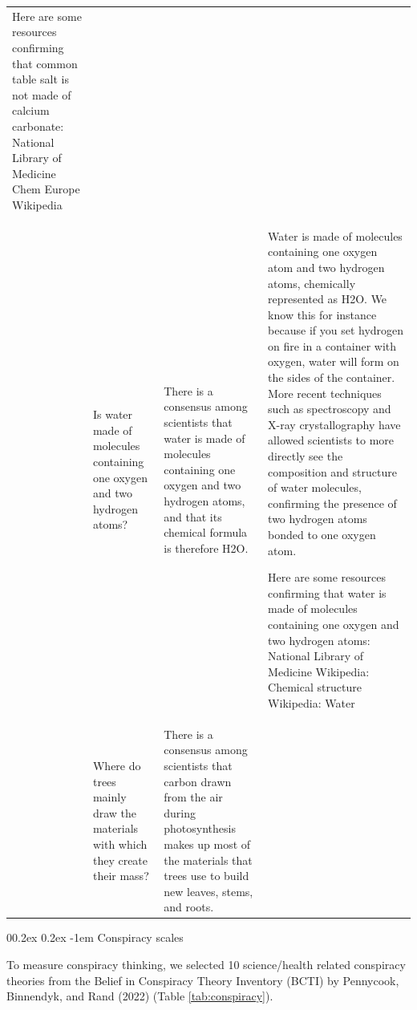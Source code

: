 \documentclass[
  doc,floatsintext]{apa6}
\makeatletter
\let\oldparagraph\paragraph
\renewcommand{\paragraph}[1]{\oldparagraph{#1}\mbox{}}
\renewcommand{\paragraph}{\@startsection{paragraph}{4}{\parindent}%
  {0\baselineskip \@plus 0.2ex \@minus 0.2ex}%
  {-1em}%
  {\normalfont\normalsize\bfseries\itshape\typesectitle}}
\makeatother
\begin{document}
\begin{longtable}[t]{>{\raggedleft\arraybackslash}p{1em}>{\raggedright\arraybackslash}p{10em}>{\raggedright\arraybackslash}p{10em}>{\raggedright\arraybackslash}p{23em}}
Here are some resources confirming that common table salt is not made of calcium carbonate: 
National Library of Medicine 
Chem Europe 
Wikipedia\\
10 & Is water made of molecules containing one oxygen and two hydrogen atoms? & There is a consensus among scientists that water is made of molecules containing one oxygen and two hydrogen atoms, and that its chemical formula is therefore H2O. & Water is made of molecules containing one oxygen atom and two hydrogen atoms, chemically represented as H2O. We know this for instance because if you set hydrogen on fire in a container with oxygen, water will form on the sides of the container. More recent techniques such as spectroscopy and X-ray crystallography have allowed scientists to more directly see the composition and structure of water molecules, confirming the presence of two hydrogen atoms bonded to one oxygen atom.

Here are some resources confirming that water is made of molecules containing one oxygen and two hydrogen atoms:
National Library of Medicine 
Wikipedia: Chemical structure 
Wikipedia: Water\\
\addlinespace
11 & Where do trees mainly draw the materials with which they create their mass? & There is a consensus among scientists that carbon drawn from the air during photosynthesis makes up most of the materials that trees use to build new leaves, stems, and roots. & \\
\bottomrule
\end{longtable}
\endgroup{}

\paragraph{Conspiracy scales}\label{conspiracy-scales}

To measure conspiracy thinking, we selected 10 science/health related conspiracy theories from the Belief in Conspiracy Theory Inventory (BCTI) by Pennycook, Binnendyk, and Rand (2022) (Table \ref{tab:conspiracy}).

\begingroup\fontsize{8}{10}\selectfont
\end{document}
